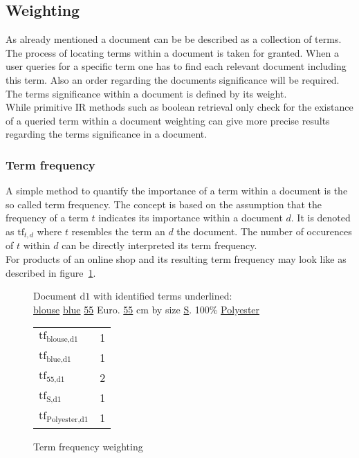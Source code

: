 \subsection{Weighting}
As already mentioned a document can be be described as a collection of terms.
The process of locating terms within a document is taken for granted.
When a user queries for a specific term one has to find each relevant document including this term.
Also an order regarding the documents significance will be required.
The terms significance within a document is defined by its weight.\citep[p.~117]{manning:2009}\\
While primitive IR methods such as boolean retrieval only check for the existance of a queried term within a document weighting can give more precise results regarding the terms significance in a document.\citep[p.~109]{manning:2009}

\subsubsection{Term frequency}
A simple method to quantify the importance of a term within a document is the so called term frequency.
The concept is based on the assumption that the frequency of a term $t$ indicates its importance within a document $d$.
It is denoted as $\text{tf}_{t,d}$ where $t$ resembles the term an $d$ the document.
The number of occurences of $t$ within $d$ can be directly interpreted its term frequency.\citep[p.~117]{manning:2009}\\
For products of an online shop and its resulting term frequency may look like as described in figure~\ref{fig:tfweighting}.\\
\begin{figure}[h]

    Document $\text{d}1$ with identified terms underlined:\\
    \underline{blouse} \underline{blue} \underline{55} Euro. \underline{55} cm by size \underline{S}. 100\% \underline{Polyester}

    \center
    \vspace{5mm}
    \begin{tabular}{ l l }
        \rowcolor{\dustRowColourHead}
        \multicolumn{2}{c}{Term frequency}\\\hline
        $\text{tf}_{\text{blouse},\text{d1}}$       & 1\\
        $\text{tf}_{\text{blue},\text{d1}}$         & 1\\
        $\text{tf}_{\text{55},\text{d1}}$           & 2\\
        $\text{tf}_{\text{S},\text{d1}}$            & 1\\
        $\text{tf}_{\text{Polyester},\text{d1}}$    & 1\\
    \end{tabular}

    \caption{Term frequency weighting}
    \label{fig:tfweighting}
\end{figure}

